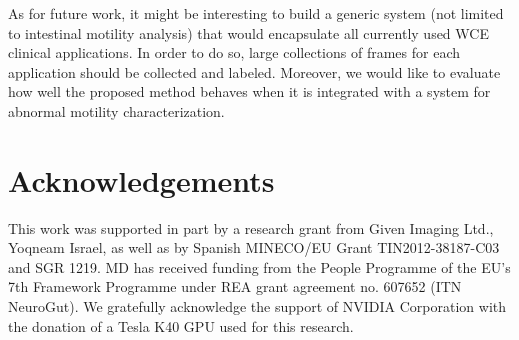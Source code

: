 \documentclass[review,12pt,3p]{elsarticle}
\begin{document}
As for future work, it might be interesting to build a generic system (not limited to intestinal motility analysis) that would encapsulate all currently used WCE clinical applications. In order to do so, large collections of frames for each application should be collected and labeled. Moreover, we would like to evaluate how well the proposed method behaves when it is integrated with a system for abnormal motility characterization.



\section*{Acknowledgements}
This work was supported in part by a research grant from
Given Imaging Ltd., Yoqneam Israel, as well as by Spanish
MINECO/EU Grant TIN2012-38187-C03 and SGR 1219. MD has received funding from the People Programme of the EU’s 7th Framework Programme under REA grant agreement no. 607652 (ITN NeuroGut). We gratefully acknowledge the support of NVIDIA Corporation with the donation of a Tesla K40 GPU used for this research.





\end{document}
